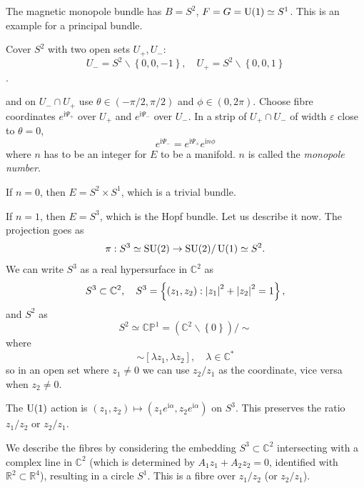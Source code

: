 \documentclass[a4paper,11pt]{article}
\begin{document}
    \begin{ex}
        The magnetic monopole bundle has $B=S^2$, $F = G = \operatorname{U}(1) \simeq S^1$. This is an example for a principal bundle.

        Cover $S^2$ with two open sets $U_+, U_-$: 
        \begin{equation}
            U_- = S^2 \backslash \left\{ 0,0,-1 \right\}, \quad U_+ = S^2 \backslash \left\{ 0,0,1 \right\}
        \end{equation}
        .

        and on $U_- \cap U_+$ use $\theta \in (-\pi/2, \pi/2)$ and $\phi \in (0,2 \pi)$. Choose fibre coordinates $e^{\mathrm{i} \Psi_+}$ over $U_+$ and $e^{\mathrm{i} \Psi_-}$ over $U_-$. In a strip of $U_+ \cap U_-$ of width $\varepsilon$ close to $\theta = 0$, 
        \begin{equation}
            e^{\mathrm{i} \Psi_-} = e^{\mathrm{i} \Psi_+} e^{\mathrm{i} n \phi}
        \end{equation}
        where $n$ has to be an integer for $E$ to be a manifold. $n$ is called the \emph{monopole number}. 

        If $n=0$, then $E = S^2 \times S^1$, which is a trivial bundle.

        If $n=1$, then $E = S^3$, which is the Hopf bundle. Let us describe it now. The projection goes as
        \begin{equation}
            \pi : S^3 \simeq \operatorname{SU}(2) \to \operatorname{SU}(2) / \operatorname{U}(1) \simeq S^2.
        \end{equation}
        We can write $S^3$ as a real hypersurface in $\mathbb{C}^2$ as 
        \begin{equation}
            S^3 \subset \mathbb{C}^2, \quad S^3 = \left\{ (z_1,z_2) : \abs{z_1}^2 + \abs{z_2}^2 = 1 \right\},
        \end{equation}
        and $S^2$ as 
        \begin{equation}
            S^2 \simeq \mathbb{CP}^1 = (\mathbb{C}^2 \backslash \left\{ 0 \right\}) / \sim 
        \end{equation}
        where 
        \begin{equation}
            [z_1, z_2] \sim [\lambda z_1, \lambda z_2], \quad \lambda \in \mathbb{C}^*
        \end{equation}
        so in an open set where $z_1 \neq 0$ we can use $z_2 / z_1$ as the coordinate, vice versa when $z_2 \neq 0$.

        The $\operatorname{U}(1)$ action is $(z_1, z_2) \mapsto (z_1 e^{\mathrm{i} \alpha}, z_2 e^{\mathrm{i} \alpha})$ on $S^3$. This preserves the ratio $z_1 / z_2$ or $z_2 / z_1$.

        We describe the fibres by considering the embedding $S^3 \subset \mathbb{C}^2$ intersecting with a complex line in $\mathbb{C}^2$ (which is determined by $A_1 z_1 + A_2 z_2 = 0$, identified with $\mathbb{R}^2 \subset \mathbb{R}^4$), resulting in a circle $S^1$. This is a fibre over $z_1 / z_2$ (or $z_2 / z_1$).
    \end{ex}
\end{document}
